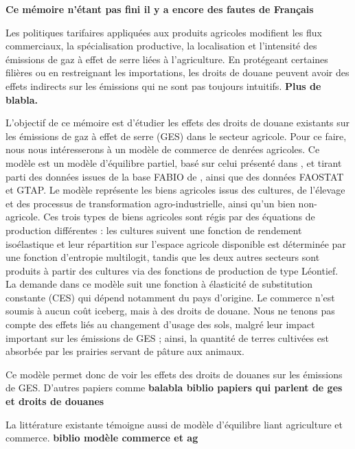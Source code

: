 \textbf{Ce mémoire n'étant pas fini il y a encore des fautes de Français}

Les politiques tarifaires appliquées aux produits agricoles modifient les flux commerciaux, la spécialisation productive, la localisation et l'intensité des émissions de gaz à effet de serre liées à l'agriculture. En protégeant certaines filières ou en restreignant les importations, les droits de douane peuvent avoir des effets indirects sur les émissions qui ne sont pas toujours intuitifs. \textbf{Plus de blabla.}

L'objectif de ce mémoire est d'étudier les effets des droits de douane existants sur les émissions de gaz à effet de serre (GES) dans le secteur agricole. Pour ce faire, nous nous intéresserons à un modèle de commerce de denrées agricoles. Ce modèle est un modèle d'équilibre partiel, basé sur celui présenté dans \cite{Gouel2021}, et tirant parti des données issues de la base FABIO de \cite{Bruckner2019}, ainsi que des données FAOSTAT et GTAP. Le modèle représente les biens agricoles issus des cultures, de l'élevage et des processus de transformation agro-industrielle, ainsi qu'un bien non-agricole. Ces trois types de biens agricoles sont régis par des équations de production différentes : les cultures suivent une fonction de rendement isoélastique et leur répartition sur l'espace agricole disponible est déterminée par une fonction d'entropie multilogit, tandis que les deux autres secteurs sont produits à partir des cultures via des fonctions de production de type Léontief. La demande dans ce modèle suit une fonction à élasticité de substitution constante (CES) qui dépend notamment du pays d'origine. Le commerce n'est soumis à aucun coût iceberg, mais à des droits de douane. Nous ne tenons pas compte des effets liés au changement d'usage des sols, malgré leur impact important sur les émissions de GES ; ainsi, la quantité de terres cultivées est absorbée par les prairies servant de pâture aux animaux.

Ce modèle permet donc de voir les effets des droits de douanes sur les émissions de GES. D'autres papiers comme \textbf{balabla biblio papiers qui parlent de ges et droits de douanes}

La littérature existante témoigne aussi de modèle d'équilibre liant agriculture et commerce. \textbf{biblio modèle commerce et ag}




